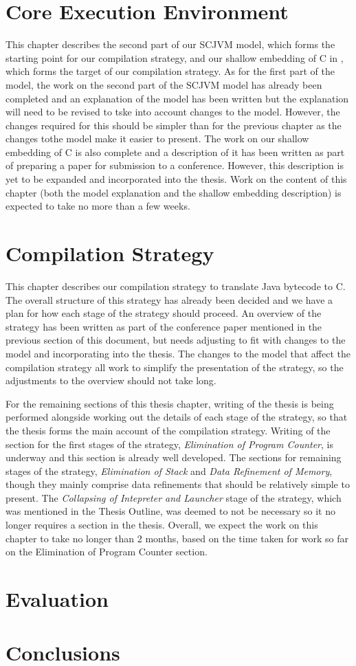 \documentclass[a4paper,12pt]{article}
\begin{document}
\section{Core Execution Environment}

This chapter describes the second part of our SCJVM model, which forms
the starting point for our compilation strategy, and our shallow
embedding of C in \Circus{}, which forms the target of our compilation
strategy.
As for the first part of the model, the work on the second part of the
SCJVM model has already been completed and an explanation of the model
has been written but the explanation will need to be revised to tske
into account changes to the model.
However, the changes required for this should be simpler than for the
previous chapter as the changes tothe model make it easier to present.
The work on our shallow embedding of C is also complete and a
description of it has been written as part of preparing a paper for
submission to a conference.
However, this description is yet to be expanded and incorporated into
the thesis. 
Work on the content of this chapter (both the model explanation and
the shallow embedding description) is expected to take no more than a
few weeks.

\section{Compilation Strategy}

This chapter describes our compilation strategy to translate Java
bytecode to C.
The overall structure of this strategy has already been decided and we
have a plan for how each stage of the strategy should proceed.
An overview of the strategy has been written as part of the conference
paper mentioned in the previous section of this document, but needs adjusting to fit
with changes to the model and incorporating into the thesis.
The changes to the model that affect the compilation strategy all work
to simplify the presentation of the strategy, so the adjustments to
the overview should not take long.

For the remaining sections of this thesis chapter, writing of the
thesis is being performed alongside working out the details of each
stage of the strategy, so that the thesis forms the main account of
the compilation strategy.
Writing of the section for the first stages of the strategy,
\emph{Elimination of Program Counter}, is underway and this section is
already well developed.
The sections for remaining stages of the strategy, \emph{Elimination
  of Stack} and \emph{Data Refinement of Memory}, though they mainly
comprise data refinements that should be relatively simple to present.
The \emph{Collapsing of Intepreter and Launcher} stage of the
strategy, which was mentioned in the Thesis Outline, was deemed to not
be necessary so it no longer requires a section in the thesis.
Overall, we expect the work on this chapter to take no longer than 2
months, based on the time taken for work so far on the Elimination of
Program Counter section.

\section{Evaluation}

\section{Conclusions}
\end{document}

